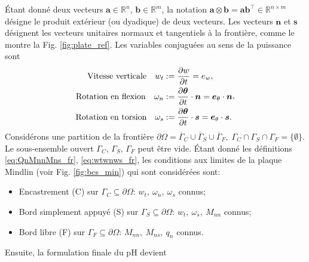 Étant donné deux vecteurs $\bm{a} \in \mathbb{R}^n, \, \bm{b} \in \mathbb{R}^m $, la notation $ \bm{a} \otimes {\bm{b}} = \bm{a} \bm{b}^\top \in \mathbb{R}^{n \times m} $ désigne le produit extérieur (ou dyadique) de deux vecteurs. Les vecteurs $\bm{n} $ et $ \bm{s}$ désignent les vecteurs unitaires normaux et tangentiels à la frontière, comme le montre la Fig. \ref{fig:plate_ref}. Les variables conjuguées au sens de la puissance sont
\begin{equation} 
\label{eq:wtwnws_fr}
\begin{aligned}
\text{Vitesse verticale}  \quad w_t &:= \diffp{w}{t} = e_w, \\
\text{Rotation en flexion} \quad 
\omega_{n} &:= \diffp{\bm{\theta}}{t} \cdot \bm{n} = \bm{e}_\theta \cdot \bm{n} \\
\text{Rotation en torsion} \quad 
\omega_{s} &:= \diffp{\bm{\theta}}{t} \cdot \bm{s} = \bm{e}_\theta \cdot \bm{s}.	
\end{aligned},
\end{equation}
Considérons une partition de la frontière $\partial\Omega = \overline{\Gamma}_{C} \cup \overline {\Gamma}_{S} \cup \overline {\Gamma}_{F}, \; {\Gamma}_{C} \cap{\Gamma}_{S} \cap {\Gamma}_{F} = \{\emptyset\} $. Le sous-ensemble ouvert $\Gamma_{C}, \, \Gamma_{S}, \, \Gamma_{F} $ peut être vide. Étant donné les définitions \eqref{eq:QnMnnMns_fr}, \eqref{eq:wtwnws_fr}, les conditions aux limites de la plaque Mindlin \cite{duran1999approximation} (voir Fig. \ref{fig:bcs_min}) qui sont considérées sont:
\begin{itemize}
\item Encastrement (C) sur $\Gamma_{C} \subseteq \partial \Omega $: $ w_t, \ \omega_{n}, \ \omega_{s}$ connus;
\item Bord simplement appuyé  (S) sur $\Gamma_{S} \subseteq \partial \Omega $: $ w_t, \ \omega_{s}, \ M_{nn} $ connus;
\item  Bord libre (F) sur $ \Gamma_{F} \subseteq \partial \Omega $: $ M_{nn}, \ M_{ns}, \ q_n$ connus.
\end{itemize}
Ensuite, la formulation finale du pH devient
